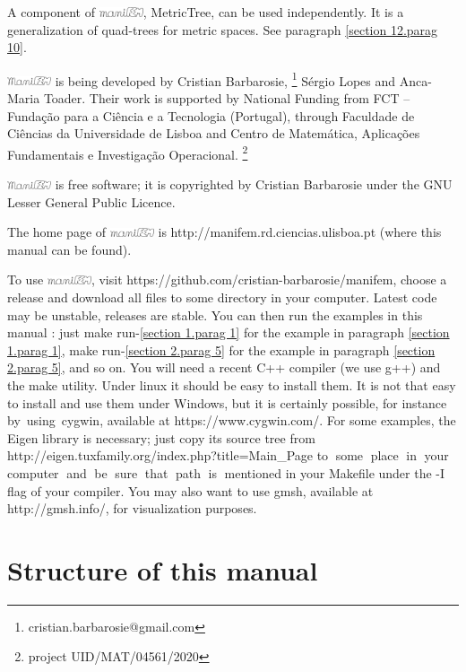 \documentclass[a4paper]{scrreprt}
\def\numb{}
\newcommand\ManiFEM{\leavevmode\hbox{\includegraphics[width=13mm]{manifem-large}}}
\newcommand\maniFEM{\leavevmode\hbox{\includegraphics[width=13mm]{manifem-small}}}
\renewcommand\tt{\normalfont\ttfamily}
\begin{document}
A component of \maniFEM, {\small\tt MetricTree}, can be used independently.
It is a generalization of quad-trees for metric spaces.
See paragraph \ref{\numb section 12.\numb parag 10}.

{\ManiFEM} is being developed by Cristian Barbarosie,%
\footnote {\small\tt cristian.barbarosie@gmail.com}
S\'ergio Lopes and Anca-Maria Toader.
Their work is supported by National Funding from FCT -- Funda\c c\~ao para a Ci\^encia e a
Tecnologia (Portugal), through Faculdade de Ci\^encias da Universidade de Lisboa and
Centro de Matem\'atica, Aplica\c c\~oes Fundamentais e Investiga\c c\~ao Operacional.%
\footnote{project UID/MAT/04561/2020}

{\ManiFEM} is free software; it is copyrighted by Cristian Barbarosie
under the GNU Lesser General Public Licence.

The home page of {\maniFEM} is
{\small\tt http://manifem.rd.ciencias.ulisboa.pt}
(where this manual can be found).

To use \maniFEM, visit {\small\tt https://github.com/cristian-barbarosie/manifem},
choose a release and download all files to some directory in your computer.
Latest code may be unstable, releases are stable.
You can then run the examples in this manual :
just {\small\tt make run-\ref{\numb section 1.\numb parag 1}}
for the example in paragraph \ref{\numb section 1.\numb parag 1},
{\small\tt make run-\ref{\numb section 2.\numb parag 5}}
for the example in paragraph \ref{\numb section 2.\numb parag 5}, and so on.
You will need a recent {\tt C++} compiler (we use {\tt g++}) and the {\tt make} utility.
Under linux it should be easy to install them.
It is not that easy to install and use them under Windows, but it is certainly possible,
for instance \hbox{by using {\small\tt cygwin}}, available at {\small\tt https://www.cygwin.com/}.
For some examples, the {\small\tt Eigen} library is necessary; just copy its source tree
from {\small\tt http://eigen.tuxfamily.org/index.php?title=Main\_Page}
to $\;$some $\;$place $\;$in $\;$your $\;$computer $\;$and $\;$be $\;$sure $\;$that
$\;$path $\;$is $\;$mentioned in your {\small\tt Makefile}
under the {\small\tt -I} flag of your compiler.
You may also want to use {\tt gmsh}, available at {\small\tt http://gmsh.info/},
for visualization purposes.

\section*{Structure of this manual}
\end{document}
